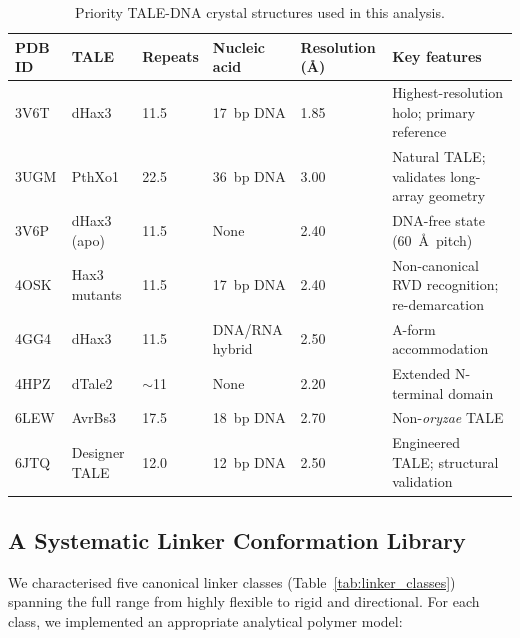 \documentclass[11pt,a4paper]{article}
\newcommand{\angstrom}{\AA}
\begin{document}
\begin{table}[H]
\centering
\caption{Priority TALE-DNA crystal structures used in this analysis.}
\label{tab:structures}
\begin{tabularx}{\textwidth}{lllXlX}
\toprule
PDB ID & TALE & Repeats & Nucleic acid & Resolution (\angstrom) & Key features \\
\midrule
3V6T & dHax3 & 11.5 & 17~bp DNA & 1.85 & Highest-resolution holo; primary reference \\
3UGM & PthXo1 & 22.5 & 36~bp DNA & 3.00 & Natural TALE; validates long-array geometry \\
3V6P & dHax3 (apo) & 11.5 & None & 2.40 & DNA-free state (60~\angstrom\ pitch) \\
4OSK & Hax3 mutants & 11.5 & 17~bp DNA & 2.40 & Non-canonical RVD recognition; re-demarcation \\
4GG4 & dHax3 & 11.5 & DNA/RNA hybrid & 2.50 & A-form accommodation \\
4HPZ & dTale2 & $\sim$11 & None & 2.20 & Extended N-terminal domain \\
6LEW & AvrBs3 & 17.5 & 18~bp DNA & 2.70 & Non-\textit{oryzae} TALE \\
6JTQ & Designer TALE & 12.0 & 12~bp DNA & 2.50 & Engineered TALE; structural validation \\
\bottomrule
\end{tabularx}
\end{table}

\subsection{A Systematic Linker Conformation Library}
\label{subsec:library}

We characterised five canonical linker classes (Table~\ref{tab:linker_classes})
spanning the full range from highly flexible to rigid and directional. For each
class, we implemented an appropriate analytical polymer model:
\end{document}
